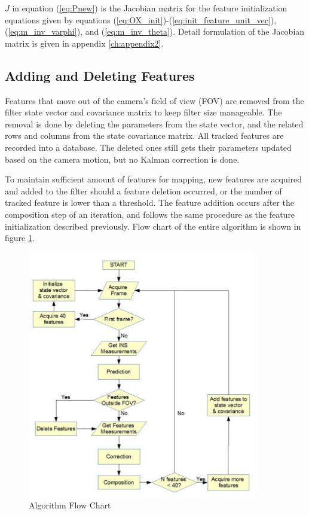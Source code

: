 $J$ in equation (\ref{eq:Pnew}) is the Jacobian matrix for the feature
initialization equations given by equations
(\ref{eq:OX_init})-(\ref{eq:init_feature_unit_vec}),
(\ref{eq:m_inv_varphi}), and (\ref{eq:m_inv_theta}). Detail
formulation of the Jacobian matrix is given in appendix
\ref{ch:appendix2}.



\subsection{Adding and Deleting Features}
Features that move out of the camera's field of view (FOV) are removed
from the filter state vector and covariance matrix to keep filter size
manageable. The removal is done by deleting the parameters from the
state vector, and the related rows and columns from the state
covariance matrix. All tracked features are recorded into a database.
The deleted ones still gets their parameters updated based on the
camera motion, but no Kalman correction is done.

To maintain sufficient amount of features for mapping, new features 
are acquired and added to the filter should a feature deletion 
occurred, or the number of tracked feature is lower than a threshold. The 
feature addition occurs after the composition step of an 
iteration, and follows the same procedure as the feature
initialization described previously. Flow chart of the entire
algorithm is shown in figure \ref{fig:flowchart}. 

\begin{figure}[h]
\centering
\includegraphics[width=10cm, keepaspectratio=true]{./Figures/flow_chart.jpg}
\caption{Algorithm Flow Chart}
\label{fig:flowchart}
\end{figure}



